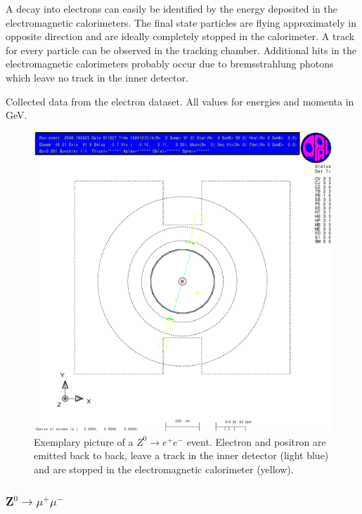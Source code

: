 \documentclass[11pt, a4paper]{article}
\numberwithin{equation}{section}
\begin{document}
A decay into electrons can easily be identified by the energy deposited in the electromagnetic calorimeters.
The final state particles are flying approximately in opposite direction and are ideally completely stopped in the calorimeter.
A track for every particle can be observed in the tracking chamber.
Additional hits in the electromagnetic calorimeters probably occur due to bremsstrahlung photons which leave no track in the inner detector.
\begin{table}
	\centering
	
	\caption{Collected data from the electron dataset. All values for energies and momenta in \si{GeV}.}
\end{table}
\begin{figure}[h]
	\centering
	\includegraphics[width=\textwidth]{./data/tag1/ee_pics/cropped/ee_02}
	\caption{Exemplary picture of a $Z^0\rightarrow e^+e^-$ event. Electron and positron are emitted back to back, leave a track in the inner detector (light blue) and are stopped in the electromagnetic calorimeter (yellow).}
\end{figure}
\clearpage
\subsubsection{Z$^0\rightarrow \mu^+\mu^-$}
\end{document}
